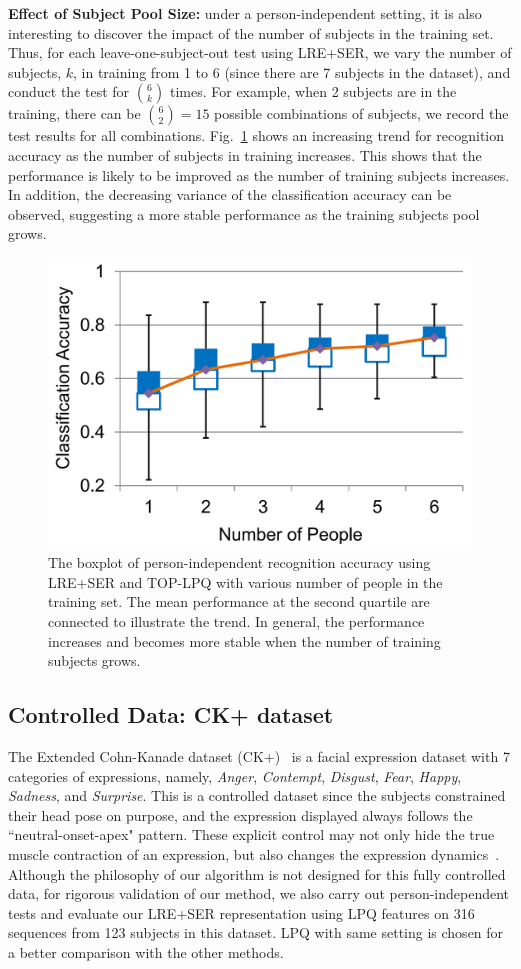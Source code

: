 \documentclass[journal]{IEEEtran}
\begin{document}
\textbf{Effect of Subject Pool Size:} under a person-independent setting, it is also interesting to discover the impact of the number of subjects in the training set. Thus, for each leave-one-subject-out test using LRE+SER, we vary the number of subjects, $k$, in training from 1 to 6 (since there are 7 subjects in the dataset), and conduct the test for ${6 \choose k}$ times. For example, when 2 subjects are in the training, there can be ${6 \choose 2}=15$ possible combinations of subjects, we record the test results for all combinations. Fig.~\ref{fig:effect_people_num} shows an increasing trend for recognition accuracy as the number of subjects in training increases. This shows that the performance is likely to be improved as the number of training subjects increases. In addition, the decreasing variance of the classification accuracy can be observed, suggesting a more stable performance as the training subjects pool grows. 


\begin{figure}[htbp]
	\centering
		\includegraphics[width=.65\columnwidth]{pics/effect_people_num.png}
	\caption{The boxplot of person-independent recognition accuracy using LRE+SER and TOP-LPQ with various number of people in the training set. The mean performance at the second quartile are connected to illustrate the trend. In general, the performance increases and becomes more stable when the number of training subjects grows.}
	\label{fig:effect_people_num}
\end{figure}


\subsection{Controlled Data: CK+ dataset}

The Extended Cohn-Kanade dataset (CK+)~\cite{CKplus} is a facial expression dataset with 7 categories of expressions, namely, \textit{Anger}, \textit{Contempt}, \textit{Disgust}, \textit{Fear}, \textit{Happy}, \textit{Sadness}, and \textit{Surprise}. This is a controlled dataset since the subjects constrained their head pose on purpose, and the expression displayed always follows the ``neutral-onset-apex" pattern. These explicit control may not only hide the true muscle contraction of an expression, but also changes the expression dynamics~\cite{Bartlett03,Ekman2005}. Although the philosophy of our algorithm is not designed for this fully controlled data, for rigorous validation of our method, we also carry out person-independent tests and evaluate our LRE+SER representation using LPQ features on 316 sequences from 123 subjects in this dataset. LPQ with same setting is chosen for a better comparison with the other methods. 
\end{document}
